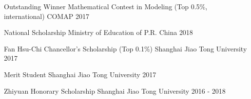 

\begin{cvhonors}
\cvhonor
{Outstanding Winner}
{Mathematical Contest in Modeling (Top 0.5\%, international)}
{COMAP}
{2017}

\cvhonor
{National Scholarship}
{}
{Ministry of Education of P.R. China}
{2018}

\cvhonor
{Fan Hsu-Chi Chancellor's Scholarship}
{(Top 0.1\%)}
{Shanghai Jiao Tong University}
{2017}

\cvhonor
{Merit Student}
{}
{Shanghai Jiao Tong University}
{2017}

\cvhonor
{Zhiyuan Honorary Scholarship}
{}
{Shanghai Jiao Tong University}
{2016 - 2018}
\end{cvhonors}
